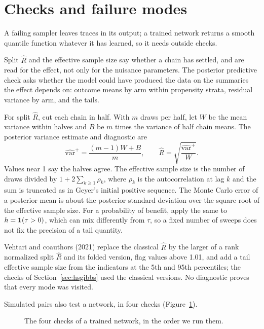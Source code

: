 \section{Checks and failure modes}\label{comp:sec:checks}

A failing sampler leaves traces in its output; a trained network returns a smooth quantile function whatever it has learned, so it needs outside checks.

Split $\hat R$ and the effective sample size say whether a chain has settled, and are read for the effect, not only for the nuisance parameters. The posterior predictive check asks whether the model could have produced the data on the summaries the effect depends on: outcome means by arm within propensity strata, residual variance by arm, and the tails.

For split $\hat R$, cut each chain in half. With $m$ draws per half, let $W$ be the mean variance within halves and $B$ be $m$ times the variance of half chain means. The posterior variance estimate and diagnostic are
\[
\widehat{\mathrm{var}}^{+}=\frac{(m-1)W+B}{m},\qquad \hat R=\sqrt{\frac{\widehat{\mathrm{var}}^{+}}{W}}.
\]
Values near 1 say the halves agree. The effective sample size is the number of draws divided by $1+2\sum_{k\ge1}\rho_k$, where $\rho_k$ is the autocorrelation at lag $k$ and the sum is truncated as in Geyer's initial positive sequence. The Monte Carlo error of a posterior mean is about the posterior standard deviation over the square root of the effective sample size. For a probability of benefit, apply the same to $h=\mathbf{1}(\tau>0)$, which can mix differently from $\tau$, so a fixed number of sweeps does not fix the precision of a tail quantity.

Vehtari and coauthors (2021) replace the classical $\hat R$ by the larger of a rank normalized split $\hat R$ and its folded version, flag values above 1.01, and add a tail effective sample size from the indicators at the 5th and 95th percentiles; the checks of Section~\ref{sec:hsgibbs} used the classical versions. No diagnostic proves that every mode was visited.

Simulated pairs also test a network, in four checks (Figure~\ref{comp:fig:checks}).

\begin{figure}[ht]
\centering
{}
\caption{The four checks of a trained network, in the order we run them.}
\label{comp:fig:checks}
\end{figure}

